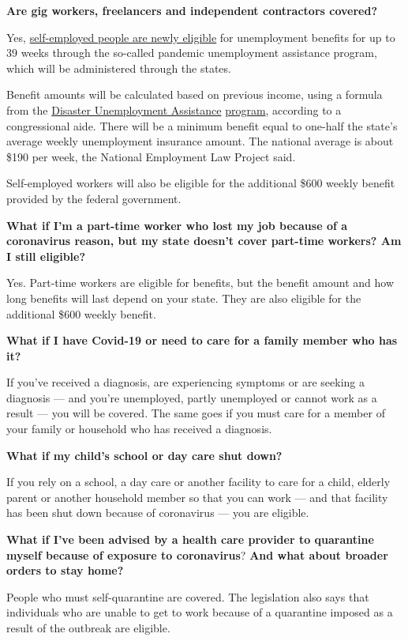 \textbf{Are gig workers, freelancers and independent contractors
covered?}

Yes,
\href{https://www.nytimes.com/article/self-employed-workers-unemployment-coronavirus-stimulus-package.html}{self-employed
people are newly eligible} for unemployment benefits for up to 39 weeks
through the so-called pandemic unemployment assistance program, which
will be administered through the states.

Benefit amounts will be calculated based on previous income, using a
formula from the
\href{https://www.law.cornell.edu/cfr/text/20/625.6}{Disaster
Unemployment Assistance}
\href{https://www.benefits.gov/benefit/597}{program}, according to a
congressional aide. There will be a minimum benefit equal to one-half
the state's average weekly unemployment insurance amount. The national
average is about \$190 per week, the National Employment Law Project
said.

Self-employed workers will also be eligible for the additional \$600
weekly benefit provided by the federal government.

\textbf{What if I'm a part-time worker who lost my job because of a
coronavirus reason, but my state doesn't cover part-time workers? Am I
still eligible?}

Yes. Part-time workers are eligible for benefits, but the benefit amount
and how long benefits will last depend on your state. They are also
eligible for the additional \$600 weekly benefit.

\textbf{What if I have Covid-19 or need to care for a family member who
has it?}

If you've received a diagnosis, are experiencing symptoms or are seeking
a diagnosis --- and you're unemployed, partly unemployed or cannot work
as a result --- you will be covered. The same goes if you must care for
a member of your family or household who has received a diagnosis.

\textbf{What if my child's school or day care shut down?}

If you rely on a school, a day care or another facility to care for a
child, elderly parent or another household member so that you can work
--- and that facility has been shut down because of coronavirus --- you
are eligible.

\textbf{What if I've been advised by a health care provider to
quarantine myself because of exposure to coronavirus}? \textbf{And what
about broader orders to stay home?}

People who must self-quarantine are covered. The legislation also says
that individuals who are unable to get to work because of a quarantine
imposed as a result of the outbreak are eligible.

